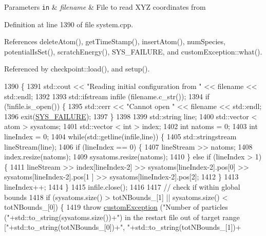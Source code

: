 \begin{DoxyParams}[1]{Parameters}
\mbox{\tt in}  & {\em filename} & File to read X\-Y\-Z coordinates from \\
\hline
\end{DoxyParams}


Definition at line 1390 of file system.\-cpp.



References delete\-Atom(), get\-Time\-Stamp(), insert\-Atom(), num\-Species, potential\-Is\-Set(), scratch\-Energy(), S\-Y\-S\-\_\-\-F\-A\-I\-L\-U\-R\-E, and custom\-Exception\-::what().



Referenced by checkpoint\-::load(), and setup().


\begin{DoxyCode}
1390                                               \{
1391     std::cout << \textcolor{stringliteral}{"Reading initial configuration from "} << filename << std::endl;
1392 
1393     std::ifstream infile (filename.c\_str());
1394     \textcolor{keywordflow}{if} (!infile.is\_open()) \{
1395         std::cerr << \textcolor{stringliteral}{"Cannot open "} << filename << std::endl;
1396         exit(\hyperlink{global_8h_a428dfe1ef0a6ff4b1fdebf275f6aff2e}{SYS\_FAILURE});
1397     \}
1398 
1399     std::string line;
1400     std::vector < atom > sysatoms;
1401     std::vector < int > index;
1402     \textcolor{keywordtype}{int} natoms = 0;
1403     \textcolor{keywordtype}{int} lineIndex = 0;
1404     \textcolor{keywordflow}{while}(std::getline(infile,line)) \{
1405         std::stringstream lineStream(line);
1406         \textcolor{keywordflow}{if} (lineIndex == 0) \{
1407             lineStream >> natoms;
1408             index.resize(natoms);
1409             sysatoms.resize(natoms);
1410         \} \textcolor{keywordflow}{else} \textcolor{keywordflow}{if} (lineIndex > 1) \{
1411             lineStream >> index[lineIndex-2] >> sysatoms[lineIndex-2].pos[0] >> sysatoms[lineIndex-2].pos[1
      ] >> sysatoms[lineIndex-2].pos[2];
1412         \}
1413         lineIndex++;
1414     \}
1415     infile.close();
1416 
1417     \textcolor{comment}{// check if within global bounds}
1418     \textcolor{keywordflow}{if} (sysatoms.size() > totNBounds\_[1] || sysatoms.size() < totNBounds\_[0]) \{
1419         \textcolor{keywordflow}{throw} \hyperlink{classcustom_exception}{customException} (\textcolor{stringliteral}{"Number of particles ("}+std::to\_string(sysatoms.size())+\textcolor{stringliteral}{") in
       the restart file out of target range ["}+std::to\_string(totNBounds\_[0])+\textcolor{stringliteral}{", "}+std::to\_string(totNBounds\_[1])+\textcolor{stringliteral}{
}
\end{DoxyCode}
